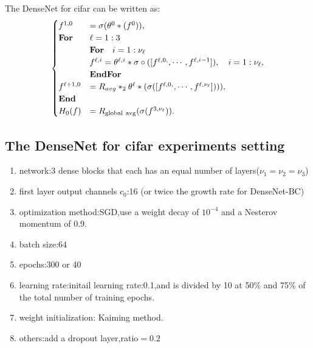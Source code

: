 The DenseNet for cifar can be written as:%
\begin{equation}\label{eq:densenet}
\begin{cases}
f^{1,0} &=\sigma(\theta^{0} \ast (f^0)), \\
\text{\bf For} &\ell = 1:3 \\
\quad &\text{\bf For} \quad i = 1:\nu_\ell \\
&f^{\ell,i} = \theta^{\ell,i}\ast \sigma \circ ([f^{\ell,0,}, \cdots, f^{\ell,i-1}]), \quad i = 1:\nu_\ell ,\\
\quad &\text{\bf EndFor} \\
f^{\ell+1,0} &=  R_{avg} \ast_2 \theta^{\ell} \ast (\sigma([f^{\ell,0,}, \cdots, f^{\ell,\nu_\ell}])) ) , \\
\text{\bf End} &\\
H_0(f) &=  R_{\rm global~avg}(\sigma(f^{3,\nu_\ell})). \\
\end{cases}
\end{equation}

\subsection{The DenseNet for cifar experiments setting}
\begin{enumerate}
\item network:3 dense blocks that each has an equal number of layers($\nu_1=\nu_2=\nu_3$)
\item first layer output channels $c_0$:16 (or twice the growth rate for DenseNet-BC)
\item optimization method:SGD,use a weight decay of $10^{-4}$ and a Nesterov momentum of 0.9.
\item batch size:$64$
\item epochs:300 or 40
\item learning rate:initail learning rate:0.1,and is divided by 10 at 50\% and 75\% of the total number of training epochs.
\item weight initialization: Kaiming method.
\item others:add a dropout layer,ratio$=0.2$
\end{enumerate}

